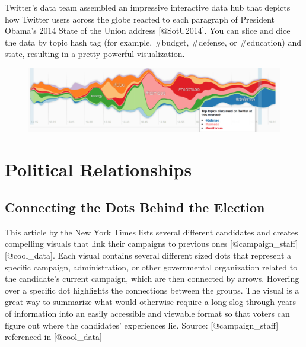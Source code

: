 \documentclass[]{book}
\theoremstyle{definition}
\theoremstyle{definition}
\theoremstyle{definition}
\theoremstyle{remark}
\begin{document}
Twitter's data team assembled an impressive interactive data hub that
depicts how Twitter users across the globe reacted to each paragraph of
President Obama's 2014 State of the Union address {[}@SotU2014{]}. You
can slice and dice the data by topic hash tag (for example, \#budget,
\#defense, or \#education) and state, resulting in a pretty powerful
visualization.

\begin{figure}
\centering
\includegraphics{images/SotU2014.png}
\caption{}
\end{figure}

\section{Political Relationships}\label{political-relationships}

\subsection{Connecting the Dots Behind the
Election}\label{connecting-the-dots-behind-the-election}

This article by the New York Times lists several different candidates
and creates compelling visuals that link their campaigns to previous
ones {[}@campaign\_staff{]}{[}@cool\_data{]}. Each visual contains
several different sized dots that represent a specific campaign,
administration, or other governmental organization related to the
candidate's current campaign, which are then connected by arrows.
Hovering over a specific dot highlights the connections between the
groups. The visual is a great way to summarize what would otherwise
require a long slog through years of information into an easily
accessible and viewable format so that voters can figure out where the
candidates' experiences lie. Source: {[}@campaign\_staff{]} referenced
in {[}@cool\_data{]}
\end{document}
